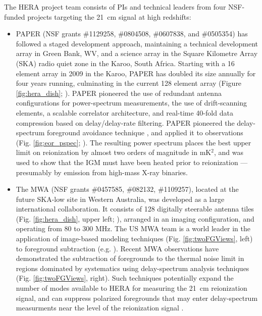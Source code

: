 \documentclass[preprint]{aastex}
\newcommand{\Mycitep}[1]{{\bf \citep{#1}}}
\newcommand{\Mycitealt}[1]{{\bf \citealt{#1}}}
\begin{document}
The HERA project team consists of PIs and technical leaders from four NSF-funded projects targeting the 21~cm signal
at high redshifts:
\begin{itemize}[noitemsep,nolistsep]

\item{PAPER} (NSF grants \#1129258, \#0804508, \#0607838, and \#0505354) has followed a
staged development approach, maintaining a technical development array in Green Bank, WV, and
a science array in the Square Kilometre Array (SKA) radio quiet zone in the Karoo, South Africa.  Starting with a 16 element
array in 2009 in the Karoo, PAPER has doubled its size annually for four years running, culminating in the current
128 element array (Figure \ref{fig:hera_dish}; \Mycitealt{parsons_et_al2012a}).
PAPER pioneered the use of redundant antenna configurations
for power-spectrum measurements, the use of drift-scanning elements,
a scalable correlator architecture,
and real-time 40-fold data compression based on delay/delay-rate filtering.
PAPER pioneered the delay-spectrum foreground avoidance technique \Mycitep{parsons_et_al2012b},
and applied it to observations (Fig. \ref{fig:eor_pspec}; \Mycitealt{parsons_et_al2013}).
The resulting power spectrum places the best upper
limit on reionization by almost two orders of magnitude in mK$^2$, and was used to show that the IGM must have
been heated prior to reionization --- presumably by emission from high-mass X-ray binaries.

\item{The MWA} (NSF grants \#0457585, \#082132, \#1109257), 
located at the future SKA-low site
in Western Australia, was developed as a large international collaboration.  It consists
of 128 digitally steerable antenna tiles (Fig. \ref{fig:hera_dish}, upper left;
\Mycitealt{tingay_et_al2013}), arranged in an imaging configuration, and operating from 80 to 300 MHz.
The US MWA team is a world leader in the application of image-based modeling techniques 
(Fig. \ref{fig:twoFGViews}, left) to
foreground subtraction (e.g. \Mycitealt{hazelton_et_al2013,morales_et_al2006a}). %
Recent MWA observations have
demonstrated the subtraction of foregrounds to the thermal noise limit in regions dominated by systematics using
delay-spectrum analysis techniques (Fig. \ref{fig:twoFGViews}, right).
Such techniques potentially
expand the number of modes available to HERA for measuring the 21~cm reionization signal,
and can suppress polarized foregrounds that may enter delay-spectrum measurments near
the level of the reionization signal \Mycitep{moore_et_al2013}. 


\end{itemize}
\end{document}
